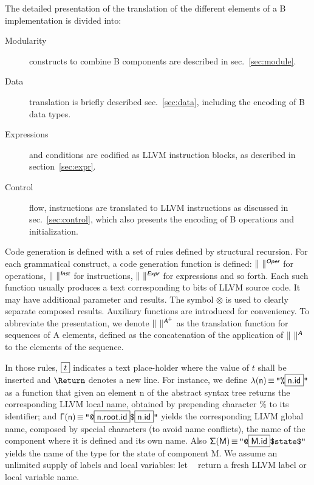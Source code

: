 \documentclass{llncs}
\newcommand{\trad}[2]{\ensuremath{\lVert \textsf{#1} \rVert^{\textit{#2}}}}
\newcommand{\nl}[0]{\text{\Return}}
\DeclareMathOperator{\isdef}{\equiv}
\DeclareMathOperator{\name}{\mathcal{L}()}
\newcommand{\llvm}[1]{\texttt{#1}}
\newcommand{\B}[1]{\textsf{#1}}
\newcommand{\ListOf}[1]{$\mbox{#1}^+$}
\newcommand{\PH}[1]{\framebox{$#1$}}
\newcommand{\sep}[0]{\otimes}
\newcommand{\Global}[0]{\ensuremath{\sf\Gamma}}
\newcommand{\local}[0]{\ensuremath{\sf\lambda}}
\newcommand{\state}[0]{\ensuremath{\sf\Sigma}}
\begin{document}
The detailed presentation of the translation of the different elements of a B
implementation is divided into:
\begin{description}
\item[Modularity] constructs to combine B components are described in
  sec.~\ref{sec:module}.
\item[Data] translation is briefly described sec.~\ref{sec:data}, including
  the encoding of B data types.
\item[Expressions] and conditions are codified as LLVM instruction blocks, as
  described in section~\ref{sec:expr}.
\item[Control] flow, instructions are translated to LLVM instructions as
  discussed in sec.~\ref{sec:control}, which also presents the encoding
  of B operations and initialization.
\end{description}

Code generation is defined with a set of rules defined by structural
recursion. For each grammatical construct, a code generation function is
defined: $\trad{~}{\B{Oper}}$ for operations, $\trad{~}{\B{Inst}}$ for
instructions, $\trad{~}{\B{Expr}}$ for expressions and so forth. Each such
function usually produces a text corresponding to bits of LLVM source code. It
may have additional parameter and results. The symbol $\sep$ is used to clearly
separate composed results. Auxiliary functions are introduced for
conveniency. To abbreviate the presentation, we denote
$\trad{~}{\ListOf{\B{A}}}$ as the translation function for sequences of \B{A}
elements, defined as the concatenation of the application of $\trad{~}{\B{A}}$
to the elements of the sequence.

In those rules, $\PH{t}$ indicates a text place-holder where the value of $t$
shall be inserted and $\nl$ denotes a new line. For instance, we define
$\local(\B{n}) \isdef \llvm{"\%\PH{\B{n.id}}"}$ as a function that given an
element \B{n} of the abstract syntax tree returns the corresponding LLVM local
name, obtained by prepending character \% to its identifier; and $\Global(\B{n})
\isdef \llvm{"@\PH{\B{n.root.id}}\$\PH{\B{n.id}}"}$ yields the corresponding
LLVM global name, composed by special characters (to avoid name conflicts), the
name of the component where it is defined and its own name. Also $\state(\B{M})
\isdef \llvm{"@\PH{\B{M.id}}\$state\$"}$ yields the name of the type for the
state of component \B{M}. We assume an unlimited supply of labels and local
variables: let $\name$ return a fresh LLVM label or local variable name.
\end{document}
